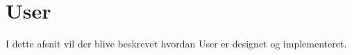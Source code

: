 \section{User}

I dette afsnit vil der blive beskrevet hvordan User er designet og implementeret.


